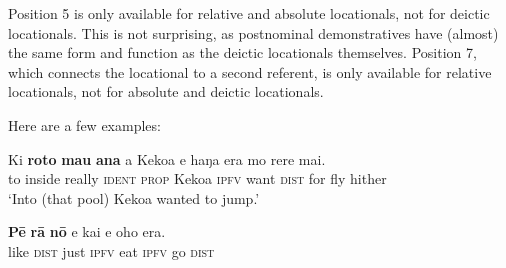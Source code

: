 \begin{table} 
\caption{Structure of the locational phrase}
\label{tab:16}
\end{table}

Position 5 is only available for relative and absolute locationals, not for deictic locationals. This is not surprising, as postnominal demonstratives have (almost) the same form and function as the deictic locationals themselves. Position 7, which connects the locational to a second referent, is only available for relative locationals, not for absolute and deictic locationals.

Here are a few examples:

\ea\label{ex:3.179}
\gll Ki \textbf{roto} \textbf{mau} \textbf{{\ꞌ}ana} a Kekoa e haŋa era mo rere mai. \\
to inside really \textsc{ident} \textsc{prop} Kekoa \textsc{ipfv} want \textsc{dist} for fly hither \\

\glt 
‘Into (that pool) Kekoa wanted to jump.’ \textstyleExampleref{[R408.012]} 
\z

\ea\label{ex:3.180}
\gll \textbf{Pē} \textbf{rā} \textbf{nō} e kai e oho era.\\
like \textsc{dist} just \textsc{ipfv} eat \textsc{ipfv} go \textsc{dist}\\

